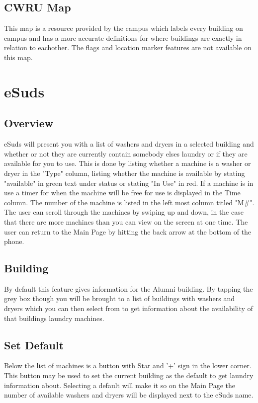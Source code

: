 \documentclass[pdftex,12pt,letter]{article}
\begin{document}
\subsection{CWRU Map}
This map is a resource provided by the campus which labels every building on campus and has a more accurate definitions for where buildings are exactly in relation to eachother. The flags and location marker features are not available on this map.

\section{eSuds}
\subsection{Overview}
eSuds will present you with a list of washers and dryers in a selected building and whether or not they are currently contain somebody elses laundry or if they are available for you to use. This is done by listing whether a machine is a washer or dryer in the "Type" column, listing whether the machine is available by stating "available" in green text under status or stating "In Use" in red. If a machine is in use a timer for when the machine will be free for use is displayed in the Time column. The number of the machine is listed in the left most column titled "M\#". The user can scroll through the machines by swiping up and down, in the case that there are more machines than you can view on the screen at one time. The user can return to the Main Page by hitting the back arrow at the bottom of the phone.
\subsection{Building}
By default this feature gives information for the Alumni building. By tapping the grey box though you will be brought to a list of buildings with washers and dryers which you can then select from to get information about the availability of that buildings laundry machines. 
\subsection{Set Default}
Below the list of machines is a button with Star and '+' sign in the lower corner. This button may be used to set the current building as the default to get laundry information about. Selecting a default will make it so on the Main Page the number of available washers and dryers will be displayed next to the eSuds name.
\end{document}
